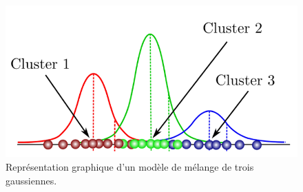 \begin{figure}[h]
  \centering
  \includegraphics[width=14cm]{./Chapitre2/figures/gmm.png}
  \caption{Représentation graphique d'un modèle de mélange de trois gaussiennes.}
  \label{fig:gmm}
\end{figure}
